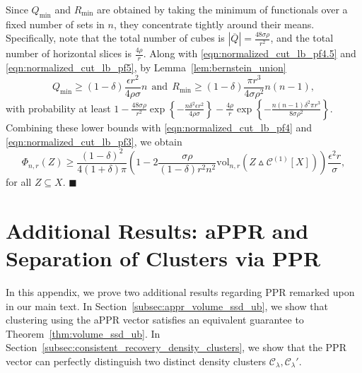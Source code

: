 \documentclass[twoside,11pt]{article}
\newcommand{\abs}[1]{\left \lvert #1 \right \rvert}
\newcommand{\set}[1]{\left\{#1\right\}}
\newcommand{\1}{\mathbf{1}}
\newcommand{\mc}[1]{\mathcal{#1}}
\newcommand{\vol}{\mathrm{vol}}
\newcommand{\qed}{\hfill $\blacksquare$}
\begin{document}
Since $Q_{\min}$ and $R_{\min}$ are obtained by taking the minimum of functionals over a fixed number of sets in $n$, they concentrate tightly around their means. Specifically, note that the total number of cubes is $\abs{\overline{Q}} = \frac{48 \sigma \rho}{r^2}$, and the total number of horizontal slices is $\frac{4\rho}{r}$. Along with \eqref{eqn:normalized_cut_lb_pf4.5} and \eqref{eqn:normalized_cut_lb_pf5}, by Lemma~\ref{lem:bernstein_union} 
\begin{equation*}
Q_{\min} \geq (1 - \delta)\frac{\epsilon r^2}{4 \rho \sigma}n ~~\textrm{and}~~ R_{\min} \geq (1 - \delta)\frac{\pi r^3}{4\sigma \rho^2 }n(n - 1),
\end{equation*}
with probability at least $1 - \frac{48 \sigma \rho}{r^2}\exp\set{-\frac{n\delta^2\epsilon r^2}{4 \rho \sigma}} - \frac{4\rho}{r}\exp\set{-\frac{n(n - 1)\delta^2\pi r^3}{8\sigma\rho^2}}$. Combining these lower bounds with \eqref{eqn:normalized_cut_lb_pf4} and \eqref{eqn:normalized_cut_lb_pf3}, we obtain 
\begin{equation*}	
\Phi_{n,r}(Z) \geq \frac{(1 - \delta)^2}{4(1 + \delta)\pi} \left(1 - 2 \frac{\sigma \rho}{(1 - \delta) r^2 n^2} \vol_{n,r}(Z \vartriangle \mc{C}^{(1)}[X]) \right) \frac{\epsilon^2 r}{\sigma},
\end{equation*}
for all $Z \subseteq X$. \qed 

\section{Additional Results: aPPR and Separation of Clusters via PPR}
\label{apdx:appr_misclassification_error}
In this appendix, we prove two additional results regarding PPR remarked upon in our main text. In Section~\ref{subsec:appr_volume_ssd_ub}, we show that clustering using the aPPR vector satisfies an equivalent guarantee to Theorem~\ref{thm:volume_ssd_ub}. In Section~\ref{subsec:consistent_recovery_density_clusters}, we show that the PPR vector can perfectly distinguish two distinct density clusters $\mc{C}_{\lambda},\mc{C}_{\lambda}'$. 
\end{document}
